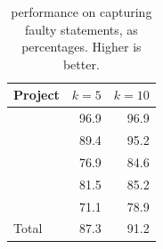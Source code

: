 \documentclass{article}
\begin{document}
\begin{table}[h]
  \small
	\centering
	\setlength{\tabcolsep}{4pt}
	\begin{tabular}{lrr}
		\toprule
		Project             &  \multicolumn{1}{c}{$k=5$} & \multicolumn{1}{c}{$k=10$} \\ %
		\midrule

        \lang{}            & 96.9 & 96.9\\
        \cmath{}           & 89.4 & 95.2\\
		\chart{}			& 76.9 & 84.6 \\
        \jtime{}            & 81.5 & 85.2\\
        \mockito{}          & 71.1 & 78.9\\\midrule
        Total          & 87.3 & 91.2\\


		\bottomrule
	\end{tabular}
	\caption { performance on capturing faulty statements, as
     percentages. Higher is better.}
   \label{tab:ds-cases-captured}

\end{table}


\end{document}

